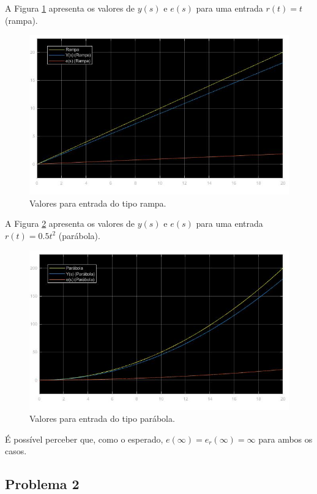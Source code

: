 \documentclass[
]{book}
\begin{document}
A Figura \ref{fig:fig41C1} apresenta os valores de \(y(s)\) e \(e(s)\) para uma entrada \(r(t) = t\) (rampa).

\begin{figure}
\includegraphics[width=0.8\linewidth]{Imagens/Lab4/Resolução/prob1C1} \caption{Valores para entrada do tipo rampa.}\label{fig:fig41C1}
\end{figure}

A Figura \ref{fig:fig41C2} apresenta os valores de \(y(s)\) e \(e(s)\) para uma entrada \(r(t) = 0.5t^2\) (parábola).

\begin{figure}
\includegraphics[width=0.8\linewidth]{Imagens/Lab4/Resolução/prob1C2} \caption{Valores para entrada do tipo parábola.}\label{fig:fig41C2}
\end{figure}

É possível perceber que, como o esperado, \(e(\infty)= e_r(\infty) = \infty\) para ambos os casos.

\hypertarget{problema-2}{%
\subsection*{Problema 2}\label{problema-2}}
\end{document}
